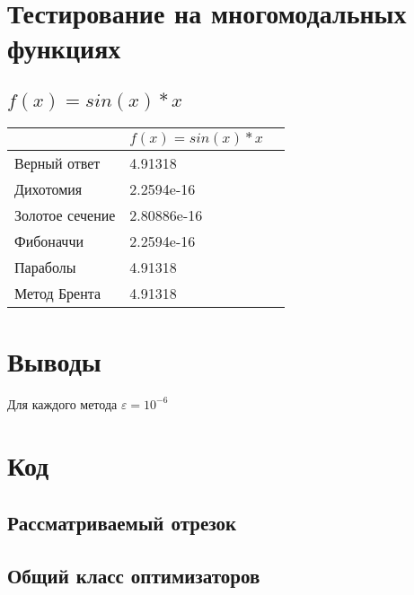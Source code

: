 
\section{Тестирование на многомодальных функциях}

\subsection{\(f(x) = sin(x)*x\)}

\begin{tabular}{ | l | l | l | }
	\hline
	 & \(f(x) = sin(x)*x\) & \\ \hline
	Верный ответ  & 4.91318 &  \\ \hline
	Дихотомия & 2.2594e-16 &\\ \hline
	Золотое сечение & 2.80886e-16 &  \\ \hline
	Фибоначчи & 2.2594e-16 & \\ \hline
	Параболы & 4.91318 &  \\ \hline
	Метод Брента & 4.91318 & \\ \hline
\end{tabular}

\section{Выводы}
Для каждого метода $\varepsilon = 10^{-6}$\\


\newpage
\section{Код}

\subsection{Рассматриваемый отрезок}

\subsection{Общий класс оптимизаторов}
\newpage

